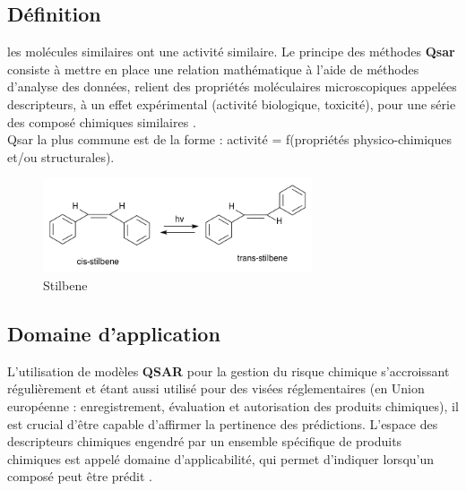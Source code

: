 \documentclass[12pt]{report}
\begin{document}
\subsection{Définition}
les molécules similaires ont une activité similaire. Le principe des méthodes \textbf{Qsar} consiste à mettre en place une relation mathématique à l'aide de méthodes d'analyse des données, relient des propriétés moléculaires microscopiques appelées descripteurs, à un effet expérimental (activité biologique, toxicité), pour une série des composé chimiques similaires \cite{ref9}.\\
Qsar la plus commune est de la forme : activité = f(propriétés physico-chimiques et/ou structurales).\\
\begin{figure}[h]
\begin{center}
\includegraphics[width=300]{qsar22.png}
\caption{Stilbene}
\end{center}
\end{figure}

\subsection{Domaine d'application}
L'utilisation de modèles \textbf{QSAR} pour la gestion du risque chimique s'accroissant régulièrement et étant aussi utilisé pour des visées réglementaires (en Union européenne : enregistrement, évaluation et autorisation des produits chimiques), il est crucial d'être capable d'affirmer la pertinence des prédictions. L'espace des descripteurs chimiques engendré par un ensemble spécifique de produits chimiques est appelé domaine d'applicabilité, qui permet d'indiquer lorsqu'un composé peut être prédit \cite{ref9}.
\end{document}
